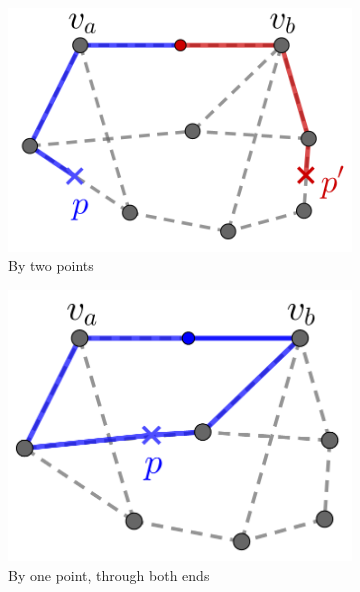 \begin{figure}
	\begin{subfigure}{0.33\textwidth}
	\centering
   	\includegraphics[scale=1]{Chaptercflg/media/example-Theo.png}
   	\caption{By two points}
   	\label{fig:teoex-a}
	\end{subfigure}
	\begin{subfigure}{0.33\textwidth}
	\centering
   	\includegraphics[scale=1]{Chaptercflg/media/example-Theo3.png}
   	\caption{By one point, through both ends}
   	\label{fig:teoex-b}
	\end{subfigure}
 	\begin{subfigure}{0.33\textwidth}
	\centering

\end{subfigure}
\end{figure}
